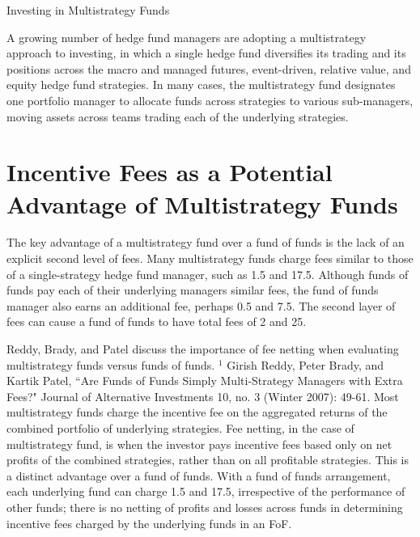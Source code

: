 \documentclass[11pt]{article}
\begin{document}
Investing in Multistrategy Funds

A growing number of hedge fund managers are adopting a multistrategy approach to investing, in which a single hedge fund diversifies its trading and its positions across the macro and managed futures, event-driven, relative value, and equity hedge fund strategies. In many cases, the multistrategy fund designates one portfolio manager to allocate funds across strategies to various sub-managers, moving assets across teams trading each of the underlying strategies.

\section*{Incentive Fees as a Potential Advantage of Multistrategy Funds}
The key advantage of a multistrategy fund over a fund of funds is the lack of an explicit second level of fees. Many multistrategy funds charge fees similar to those of a single-strategy hedge fund manager, such as 1.5 and 17.5. Although funds of funds pay each of their underlying managers similar fees, the fund of funds manager also earns an additional fee, perhaps 0.5 and 7.5. The second layer of fees can cause a fund of funds to have total fees of 2 and 25.

Reddy, Brady, and Patel discuss the importance of fee netting when evaluating multistrategy funds versus funds of funds. ${ }^{1}$ Girish Reddy, Peter Brady, and Kartik Patel, “Are Funds of Funds Simply Multi-Strategy Managers with Extra Fees?" Journal of Alternative Investments 10, no. 3 (Winter 2007): 49-61. Most multistrategy funds charge the incentive fee on the aggregated returns of the combined portfolio of underlying strategies. Fee netting, in the case of multistrategy fund, is when the investor pays incentive fees based only on net profits of the combined strategies, rather than on all profitable strategies. This is a distinct advantage over a fund of funds. With a fund of funds arrangement, each underlying fund can charge 1.5 and 17.5, irrespective of the performance of other funds; there is no netting of profits and losses across funds in determining incentive fees charged by the underlying funds in an FoF.
\end{document}
